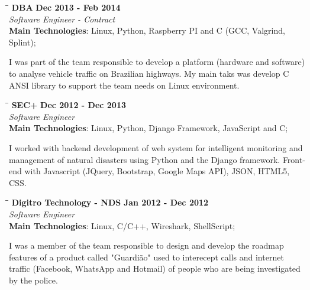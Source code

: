 \documentclass[margin]{res}
\begin{document}
\begin{resume}
\vspace{-0.1in}
   \begin{tabbing}
   \hspace{2.3in}\= \hspace{1.7in}\= \kill %
    \textbf{DBA}    \>\>\textbf{Dec 2013 - Feb 2014}\\
    \textit{Software Engineer - Contract}\\        
    \textbf{Main Technologies}: Linux, Python, Raspberry PI and C (GCC, Valgrind, Splint);
   \end{tabbing}\vspace{-20pt}      %
    \vspace{2mm}
I was part of the team responsible to develop a platform (hardware and software) to analyse vehicle
traffic on Brazilian highways. My main taks was develop C ANSI library to support the team needs on Linux
environment.

\vspace{-0.1in}
   \begin{tabbing}
   \hspace{2.3in}\= \hspace{1.7in}\= \kill %
    \textbf{SEC+}    \>\>\textbf{Dec 2012 - Dec 2013}\\
    \textit{Software Engineer}\\        
    \textbf{Main Technologies}: Linux, Python, Django Framework, JavaScript and C;
   \end{tabbing}\vspace{-20pt}      %
    \vspace{2mm}
     I worked with backend development of web system for intelligent monitoring 
     and management of natural disasters using Python and the Django framework. 
     Front-end with Javascript (JQuery, Bootstrap, Google Maps API),
     JSON, HTML5, CSS.

   \begin{tabbing}
   \hspace{2.3in}\= \hspace{1.7in}\= \kill %
    \textbf{Digitro Technology - NDS}    \>\>\textbf{Jan 2012 - Dec 2012}\\
    \textit{Software Engineer}\\   
    \textbf{Main Technologies}: Linux, C/C++, Wireshark, ShellScript;
   \end{tabbing}\vspace{-20pt}      %
    \vspace{2mm}
    I was a member of the team responsible to design and develop the roadmap features of a product called
    "Guardião" used to interecept calls and internet traffic (Facebook, WhatsApp and Hotmail) of people who are 
    being investigated by the police.


\end{resume}
\end{document}
